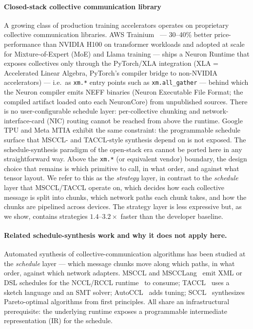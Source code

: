 \paragraph{Closed-stack collective communication library} A growing class of
production training accelerators operates on proprietary collective communication libraries. AWS Trainium~\cite{aws_trainium_neuron,
aws_trainium2_2024} --- 30--40\% better
price-performance than NVIDIA H100 on transformer workloads and
adopted at scale for Mixture-of-Expert (MoE) and Llama training --- ships a Neuron
Runtime that exposes collectives only through the PyTorch/XLA
integration (XLA = Accelerated Linear Algebra, PyTorch's
compiler bridge to non-NVIDIA accelerators) --- i.e.\ as
\texttt{xm.*} entry points such as
\texttt{xm.\allowbreak{}all\_gather} --- behind which the Neuron
compiler emits NEFF binaries (Neuron Executable File Format;
the compiled artifact loaded onto each NeuronCore) from
unpublished sources. There is no
user-configurable schedule layer: per-collective chunking and
network-interface-card (NIC) routing cannot be reached from
above the runtime. Google TPU and Meta MTIA exhibit the same
constraint: the programmable schedule surface that MSCCL- and
TACCL-style synthesis depend on is not exposed. The schedule-synthesis paradigm
of the open-stack era cannot be ported here in any straightforward
way. Above the \texttt{xm.*} (or equivalent vendor) boundary, the
design choice that remains is which primitive to call, in what
order, and against what tensor layout. We refer to this as the \emph{strategy} layer,
in contrast to the \emph{schedule} layer that MSCCL/TACCL
operate on, which decides how each collective message is split
into chunks, which network paths each chunk takes, and how the
chunks are pipelined across devices. The strategy layer is less expressive
but, as we show, contains strategies $1.4$--$3.2\times$ faster
than the developer baseline.

\paragraph{Related schedule-synthesis work and why it does not
apply here.} Automated synthesis of collective-communication
algorithms has been studied at the \emph{schedule} layer ---
which message chunks move along which paths, in what order, against
which network adapters. MSCCL and MSCCLang~\cite{cowan2022msccl}
emit XML or DSL schedules for the NCCL/RCCL runtime~\cite{nvidia_nccl} to consume;
TACCL~\cite{shah2023taccl} uses a sketch language and an SMT
solver; AutoCCL~\cite{xu2025autoccl} adds tuning;
SCCL~\cite{cai2021sccl} synthesizes Pareto-optimal algorithms
from first principles. All share an infrastructural prerequisite:
the underlying runtime exposes a programmable intermediate
representation (IR) for the schedule.


